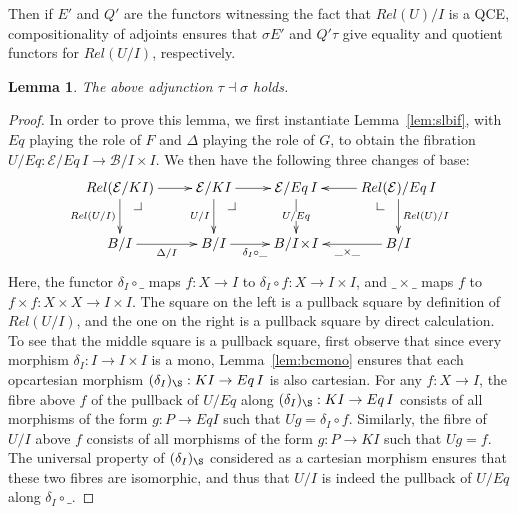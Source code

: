 \documentclass{LMCS}
\makeatletter
\newcommand\pbc[1][dr]{\save*!/#1-1.8pc/#1:(-1,1)@^{|-}\restore}
\newcommand\E{{\mathcal E}}
\newcommand\B{{\mathcal B}}
\newcommand\ti{\!\times\!}
\theoremstyle{plain}
\newtheorem{lemma}[theorem]{Lemma}
\theoremstyle{remark}
\theoremstyle{definition}
\makeatother
\begin{document}
\vspace*{0.1in}

\noindent
Then if $E'$ and $Q'$ are the functors witnessing the fact that
$Rel(U)/I$ is a QCE, compositionality of adjoints ensures that
$\sigma E'$ and $Q'\tau$ give equality and quotient functors for
$Rel(U/I)$, respectively.

\vspace*{0.1in}

\begin{lemma}\label{lem:tausigma}
  The above adjunction $\tau \dashv \sigma$ holds. 
\end{lemma}
\begin{proof}
  In order to prove this lemma, we first instantiate
  Lemma~\ref{lem:slbif}, with $Eq$ playing the role of $F$ and
  $\Delta$ playing the role of $G$, to obtain the fibration
  $U/Eq:\E/Eq\,I\to \B/I\ti I$. We then have the following three
  changes of base:
  \[\xymatrix{ Rel(\E/KI) \ar[d]_{Rel(U/I)}\ar[r]\pbc & \E/KI
    \ar[d]_{U/I} \ar[r] \pbc & \E/Eq\,I \ar[d]|{U/Eq} & \ar[l]
    Rel(\E)/Eq\,I \ar[d]^{Rel(U)/I} \pbc[dl]\\ B/I \ar[r]_{\Delta/I} &
    B/I\ar[r]_{\delta_I\circ\_}&B/I\ti I & \ar[l]^{\_\times\_} B/I}\]
  Here, the functor $\delta_I\circ \_$ maps $f:X\to I$ to
  $\delta_I\circ f:X\to I\ti I$, and $\_\ti\_$ maps $f$ to $f\ti
  f:X\ti X\to I\ti I$. The square on the left is a pullback square by
  definition of $Rel(U/I)$, and the one on the right is a pullback
  square by direct calculation. To see that the middle square is a
  pullback square, first observe that since every morphism
  $\delta_I:I\to I\ti I$ is a mono, Lemma~\ref{lem:bcmono} ensures
  that each opcartesian morphism $(\delta_I)_\S:KI\to Eq\,I$ is also
  cartesian.  For any $f:X\to I$, the fibre above $f$ of the pullback
  of $U/Eq$ along $(\delta_I)_\S:KI\to Eq\,I$ consists of all
  morphisms of the form $g : P \to Eq I$ such that $Ug = \delta_I
  \circ f$. Similarly, the fibre of $U/I$ above $f$ consists of all
  morphisms of the form $g : P \to KI$ such that $Ug = f$. The
  universal property of $(\delta_I)_\S$ considered as a cartesian
  morphism ensures that these two fibres are isomorphic, and thus that
  $U/I$ is indeed the pullback of $U/Eq$ along $\delta_I \circ \_$.


\end{proof}
\end{document}
